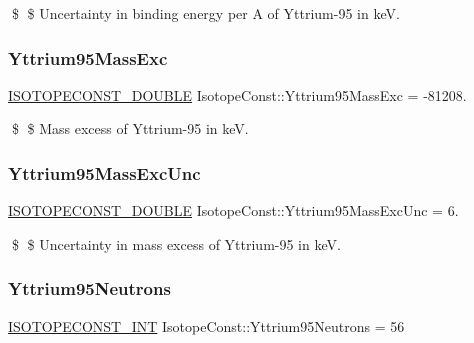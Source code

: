\$ \$ Uncertainty in binding energy per A of Yttrium-\/95 in keV. \mbox{\label{group___isotope_const-_yttrium-_y95_gaec2ba5a8d73164d57d788c4df63e86fa}} 
\subsubsection{\texorpdfstring{Yttrium95\+Mass\+Exc}{Yttrium95MassExc}}
{\footnotesize\ttfamily \mbox{\hyperlink{group___isotope_const-_macros_ga8f45a7272ce02c0b4c65c44636ed719a}{I\+S\+O\+T\+O\+P\+E\+C\+O\+N\+S\+T\+\_\+\+D\+O\+U\+B\+LE}} Isotope\+Const\+::\+Yttrium95\+Mass\+Exc = -\/81208.}

\$ \$ Mass excess of Yttrium-\/95 in keV. \mbox{\label{group___isotope_const-_yttrium-_y95_ga426caf8c1ccc6c5d84141fd91df0d3e4}} 
\subsubsection{\texorpdfstring{Yttrium95\+Mass\+Exc\+Unc}{Yttrium95MassExcUnc}}
{\footnotesize\ttfamily \mbox{\hyperlink{group___isotope_const-_macros_ga8f45a7272ce02c0b4c65c44636ed719a}{I\+S\+O\+T\+O\+P\+E\+C\+O\+N\+S\+T\+\_\+\+D\+O\+U\+B\+LE}} Isotope\+Const\+::\+Yttrium95\+Mass\+Exc\+Unc = 6.}

\$ \$ Uncertainty in mass excess of Yttrium-\/95 in keV. \mbox{\label{group___isotope_const-_yttrium-_y95_ga8f85eb734a482be6c3b610a2967d51fb}} 
\subsubsection{\texorpdfstring{Yttrium95\+Neutrons}{Yttrium95Neutrons}}
{\footnotesize\ttfamily \mbox{\hyperlink{group___isotope_const-_macros_ga5f18360b3e99483a35c32d789e62621c}{I\+S\+O\+T\+O\+P\+E\+C\+O\+N\+S\+T\+\_\+\+I\+NT}} Isotope\+Const\+::\+Yttrium95\+Neutrons = 56}

